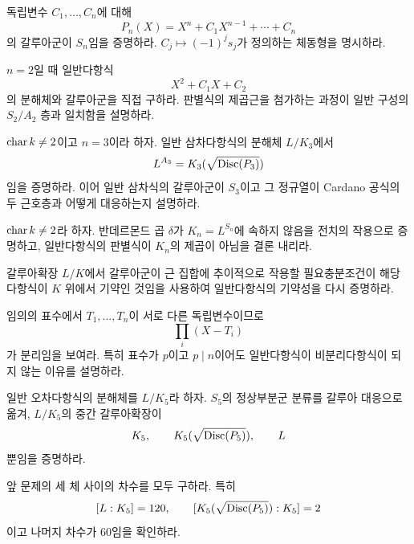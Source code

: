 \begin{exercise}[*]
독립변수 $C_1,\dots,C_n$에 대해
\[
  P_n(X)=X^n+C_1X^{n-1}+\cdots+C_n
\]
의 갈루아군이 $S_n$임을 증명하라. $C_j\mapsto(-1)^js_j$가 정의하는 체동형을 명시하라.
\end{exercise}

\begin{exercise}
$n=2$일 때 일반다항식
\[
  X^2+C_1X+C_2
\]
의 분해체와 갈루아군을 직접 구하라. 판별식의 제곱근을 첨가하는 과정이 일반 구성의 $S_2/A_2$ 층과 일치함을 설명하라.
\end{exercise}

\begin{exercise}[*]
$\operatorname{char} k\ne2$이고 $n=3$이라 하자. 일반 삼차다항식의 분해체 $L/K_3$에서
\[
  L^{A_3}=K_3(\sqrt{\operatorname{Disc}(P_3)})
\]
임을 증명하라. 이어 일반 삼차식의 갈루아군이 $S_3$이고 그 정규열이 Cardano 공식의 두 근호층과 어떻게 대응하는지 설명하라.
\end{exercise}

\begin{exercise}
$\operatorname{char} k\ne2$라 하자. 반데르몬드 곱 $\delta$가 $K_n=L^{S_n}$에 속하지 않음을 전치의 작용으로 증명하고, 일반다항식의 판별식이 $K_n$의 제곱이 아님을 결론 내리라.
\end{exercise}

\begin{exercise}[*]
갈루아확장 $L/K$에서 갈루아군이 근 집합에 추이적으로 작용할 필요충분조건이 해당 다항식이 $K$ 위에서 기약인 것임을 사용하여 일반다항식의 기약성을 다시 증명하라.
\end{exercise}

\begin{exercise}
임의의 표수에서 $T_1,\dots,T_n$이 서로 다른 독립변수이므로
\[
  \prod_i(X-T_i)
\]
가 분리임을 보여라. 특히 표수가 $p$이고 $p\mid n$이어도 일반다항식이 비분리다항식이 되지 않는 이유를 설명하라.
\end{exercise}

\begin{exercise}[*]
일반 오차다항식의 분해체를 $L/K_5$라 하자. $S_5$의 정상부분군 분류를 갈루아 대응으로 옮겨, $L/K_5$의 중간 갈루아확장이
\[
  K_5,
  \qquad K_5(\sqrt{\operatorname{Disc}(P_5)}),
  \qquad L
\]
뿐임을 증명하라.
\end{exercise}

\begin{exercise}
앞 문제의 세 체 사이의 차수를 모두 구하라. 특히
\[
  [L:K_5]=120,
  \qquad
  [K_5(\sqrt{\operatorname{Disc}(P_5)}):K_5]=2
\]
이고 나머지 차수가 $60$임을 확인하라.
\end{exercise}

